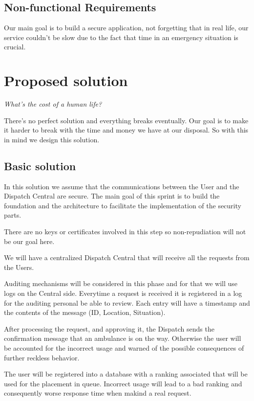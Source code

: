 \documentclass[a4paper,titlepage,11pt]{article}
\begin{document}
\subsection{Non-functional Requirements}
Our main goal is to build a secure application, not forgetting that in real life,
our service couldn't be slow due to the fact that time in an emergency situation is crucial.

\section{Proposed solution}

\begin{center}
  \textit{What's the cost of a human life?}
\end{center}

There's no perfect solution and everything breaks eventually.
Our goal is to make it harder to break with the time and money we have at our disposal.
So with this in mind we design this solution.

\subsection{Basic solution}
In this solution we assume that the communications between the User and the Dispatch Central are secure.
The main goal of this sprint is to build the foundation and the architecture to facilitate the implementation of the security parts.

There are no keys or certificates involved in this step so non-repudiation will not be our goal here.

We will have a centralized Dispatch Central that will receive all the requests from the Users.

Auditing mechanisms will be considered in this phase and for that we will use logs on the Central side.
Everytime a request is received it is registered in a log for the auditing personal be able to review.
Each entry will have a timestamp and the contents of the message (ID, Location, Situation).

After processing the request, and approving it, the Dispatch sends the confirmation message that an ambulance is on the way.
Otherwise the user will be accounted for the incorrect usage and warned of the possible consequences of further reckless behavior.

The user will be registered into a database with a ranking associated that will be used for the placement in queue.
Incorrect usage will lead to a bad ranking and consequently worse response time when makind a real request.
\end{document}
